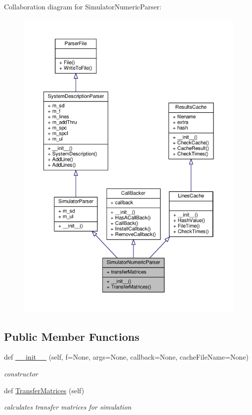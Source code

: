 Collaboration diagram for Simulator\+Numeric\+Parser\+:\nopagebreak
\begin{figure}[H]
\begin{center}
\leavevmode
\includegraphics[width=350pt]{classSignalIntegrity_1_1Parsers_1_1SimulatorNumericParser_1_1SimulatorNumericParser__coll__graph}
\end{center}
\end{figure}
\subsection*{Public Member Functions}
\begin{DoxyCompactItemize}
\item 
def \hyperlink{classSignalIntegrity_1_1Parsers_1_1SimulatorNumericParser_1_1SimulatorNumericParser_a5ce77900c33ce9b681aebb5c527ab92a}{\+\_\+\+\_\+init\+\_\+\+\_\+} (self, f=None, args=None, callback=None, cache\+File\+Name=None)
\begin{DoxyCompactList}\small\item\em constructor \end{DoxyCompactList}\item 
def \hyperlink{classSignalIntegrity_1_1Parsers_1_1SimulatorNumericParser_1_1SimulatorNumericParser_a836e87421e9e21a6676da06625b644b1}{Transfer\+Matrices} (self)
\begin{DoxyCompactList}\small\item\em calculates transfer matrices for simulation \end{DoxyCompactList}\end{DoxyCompactItemize}


